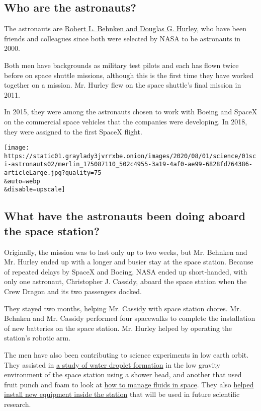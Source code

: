 \hypertarget{who-are-the-astronauts}{%
\subsection{Who are the astronauts?}\label{who-are-the-astronauts}}

The astronauts are
\href{https://www.nytimes3xbfgragh.onion/2020/05/27/science/bob-behnken-doug-hurley.html}{Robert
L. Behnken and Douglas G. Hurley}, who have been friends and colleagues
since both were selected by NASA to be astronauts in 2000.

Both men have backgrounds as military test pilots and each has flown
twice before on space shuttle missions, although this is the first time
they have worked together on a mission. Mr. Hurley flew on the space
shuttle's final mission in 2011.

In 2015, they were among the astronauts chosen to work with Boeing and
SpaceX on the commercial space vehicles that the companies were
developing. In 2018, they were assigned to the first SpaceX flight.

\texttt{[image: https://static01.graylady3jvrrxbe.onion/images/2020/08/01/science/01sci-astronauts02/merlin\_175087110\_502c4955-3a19-4af0-ae99-6828fd764386-articleLarge.jpg?quality=75\\\&auto=webp\\\&disable=upscale]}

\hypertarget{what-have-the-astronauts-been-doing-aboard-the-space-station}{%
\subsection{What have the astronauts been doing aboard the space
station?}\label{what-have-the-astronauts-been-doing-aboard-the-space-station}}

Originally, the mission was to last only up to two weeks, but Mr.
Behnken and Mr. Hurley ended up with a longer and busier stay at the
space station. Because of repeated delays by SpaceX and Boeing, NASA
ended up short-handed, with only one astronaut, Christopher J. Cassidy,
aboard the space station when the Crew Dragon and its two passengers
docked.

They stayed two months, helping Mr. Cassidy with space station chores.
Mr. Behnken and Mr. Cassidy performed four spacewalks to complete the
installation of new batteries on the space station. Mr. Hurley helped by
operating the station's robotic arm.

The men have also been contributing to science experiments in low earth
orbit. They assisted in
\href{https://www.nasa.gov/mission_pages/station/research/behnken-hurley-science-scrapbook}{a
study of water droplet formation} in the low gravity environment of the
space station using a shower head, and another that used fruit punch and
foam to look at \href{https://www.youtube.com/watch?v=2Dzx6b6vSK4}{how
to manage fluids in space}. They also
\href{https://www.nasa.gov/mission_pages/station/research/behnken-hurley-science-scrapbook}{helped
install new equipment inside the station} that will be used in future
scientific research.

